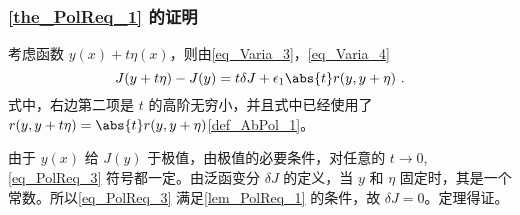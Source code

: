  \subsubsection{\autoref{the_PolReq_1} 的证明}
考虑函数 $y(x)+t\eta(x)$，则由\autoref{eq_Varia_3}，\autoref{eq_Varia_4} 
\begin{equation}\label{eq_PolReq_3}
J(y+t\eta)-J(y)=t\delta J+\epsilon_1\abs{t}r(y,y+\eta)~.
\end{equation}
式中，右边第二项是 $t$ 的高阶无穷小，并且式中已经使用了 $r(y,y+t\eta)=\abs{t}r(y,y+\eta)$\autoref{def_AbPol_1}。

由于 $y(x)$ 给 $J(y)$ 于极值，由极值的必要条件，对任意的 $t\rightarrow0$, \autoref{eq_PolReq_3} 符号都一定。由泛函变分 $\delta J$ 的定义，当 $y$ 和 $\eta$ 固定时，其是一个常数。所以\autoref{eq_PolReq_3} 满足\autoref{lem_PolReq_1} 的条件，故 $\delta J=0$。定理得证。
